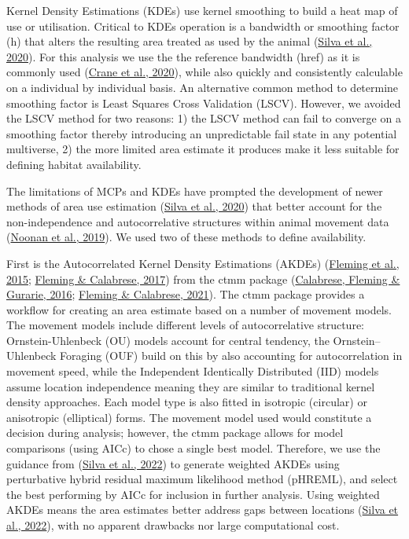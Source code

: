 \documentclass[10pt,a4paper]{article}
\begin{document}
Kernel Density Estimations (KDEs) use kernel smoothing to build a heat map of use or utilisation.
Critical to KDEs operation is a bandwidth or smoothing factor (h) that alters the resulting area treated as used by the animal (\protect\hyperlink{ref-silva_reptiles_2020}{Silva et al., 2020}).
For this analysis we use the the reference bandwidth (href) as it is commonly used (\protect\hyperlink{ref-crane_lots_2020}{Crane et al., 2020}), while also quickly and consistently calculable on a individual by individual basis.
An alternative common method to determine smoothing factor is Least Squares Cross Validation (LSCV).
However, we avoided the LSCV method for two reasons: 1) the LSCV method can fail to converge on a smoothing factor thereby introducing an unpredictable fail state in any potential multiverse, 2) the more limited area estimate it produces make it less suitable for defining habitat availability.

The limitations of MCPs and KDEs have prompted the development of newer methods of area use estimation (\protect\hyperlink{ref-silva_reptiles_2020}{Silva et al., 2020}) that better account for the non-independence and autocorrelative structures within animal movement data (\protect\hyperlink{ref-Noonan2018}{Noonan et al., 2019}).
We used two of these methods to define availability.

First is the Autocorrelated Kernel Density Estimations (AKDEs) (\protect\hyperlink{ref-Fleming2015}{Fleming et al., 2015}; \protect\hyperlink{ref-Fleming2017}{Fleming \& Calabrese, 2017}) from the ctmm package (\protect\hyperlink{ref-Calabrese2016}{Calabrese, Fleming \& Gurarie, 2016}; \protect\hyperlink{ref-ctmm}{Fleming \& Calabrese, 2021}).
The ctmm package provides a workflow for creating an area estimate based on a number of movement models.
The movement models include different levels of autocorrelative structure: Ornstein-Uhlenbeck (OU) models account for central tendency, the Ornstein--Uhlenbeck Foraging (OUF) build on this by also accounting for autocorrelation in movement speed, while the Independent Identically Distributed (IID) models assume location independence meaning they are similar to traditional kernel density approaches.
Each model type is also fitted in isotropic (circular) or anisotropic (elliptical) forms.
The movement model used would constitute a decision during analysis; however, the ctmm package allows for model comparisons (using AICc) to chose a single best model.
Therefore, we use the guidance from (\protect\hyperlink{ref-silva_autocorrelationinformed_2022}{Silva et al., 2022}) to generate weighted AKDEs using perturbative hybrid residual maximum likelihood method (pHREML), and select the best performing by AICc for inclusion in further analysis.
Using weighted AKDEs means the area estimates better address gaps between locations (\protect\hyperlink{ref-silva_autocorrelationinformed_2022}{Silva et al., 2022}), with no apparent drawbacks nor large computational cost.
\end{document}
